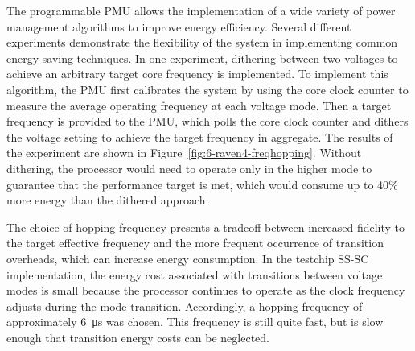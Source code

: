 \documentclass[graybox]{svmult}
\begin{document}
The programmable PMU allows the implementation of a wide variety of power management algorithms to improve energy efficiency.
Several different experiments demonstrate the flexibility of the system in implementing common energy-saving techniques.
In one experiment, dithering between two voltages to achieve an arbitrary target core frequency is implemented.
To implement this algorithm, the PMU first calibrates the system by using the core clock counter to measure the average operating frequency at each voltage mode.
Then a target frequency is provided to the PMU, which polls the core clock counter and dithers the voltage setting to achieve the target frequency in aggregate.
The results of the experiment are shown in Figure~\ref{fig:6-raven4-freqhopping}.
Without dithering, the processor would need to operate only in the higher mode to guarantee that the performance target is met, which would consume up to 40\% more energy than the dithered approach.

The choice of hopping frequency presents a tradeoff between increased fidelity to the target effective frequency and the more frequent occurrence of transition overheads, which can increase energy consumption.
In the testchip SS-SC implementation, the energy cost associated with transitions between voltage modes is small because the processor continues to operate as the clock frequency adjusts during the mode transition.
Accordingly, a hopping frequency of approximately \SI{6}{\micro\second} was chosen.
This frequency is still quite fast, but is slow enough that transition energy costs can be neglected.
\end{document}
